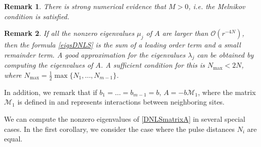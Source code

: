 \documentclass[12pt]{elsarticle}
\newtheorem{remark}{Remark}
\begin{document}
\begin{remark}
There is strong numerical evidence that $M > 0$, i.e. the Melnikov condition is satisfied.
\end{remark}

\begin{remark}
If all the nonzero eigenvalues $\mu_j$ of $A$ are larger than $\mathcal{O}(r^{-4N})$, then the formula \cref{eigsDNLS} is the sum of a leading order term and a small remainder term. A good approximation for the eigenvalues $\lambda_j$ can be obtained by computing the eigenvalues of $A$. A sufficient condition for this is $N_{\mathrm{max}} < 2 N$, where $N_{\mathrm{max}} = \frac{1}{2} \max\{ N_1, \dots, N_{m-1}\}$.
\end{remark}

\noindent In addition, we remark that if $b_1 = \dots = b_{m-1} = b$, $A = -b \mathcal{M}_1$, where the matrix $\mathcal{M}_1$ is defined in \cite[(2.84)]{Kevrekidis2009} and represents interactions between neighboring sites.

We can compute the nonzero eigenvalues of \cref{DNLSmatrixA} in several special cases. In the first corollary, we consider the case where the pulse distances $N_i$ are equal.
\end{document}
